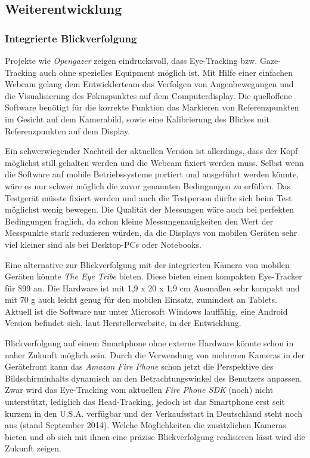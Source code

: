 \subsection{Weiterentwicklung}
\subsubsection{Integrierte Blickverfolgung}
Projekte wie \emph{Opengazer} \cite{TheInferenceGroup..2009} zeigen eindrucksvoll, dass Eye-Tracking bzw. Gaze-Tracking auch ohne spezielles Equipment möglich ist.
Mit Hilfe einer einfachen Webcam gelang dem Entwicklerteam das Verfolgen von Augenbewegungen und die Visualisierung des Fokuspunktes auf dem Computerdisplay.
Die quelloffene Software benötigt für die korrekte Funktion das Markieren von Referenzpunkten im Gesicht auf dem Kamerabild, sowie eine Kalibrierung des Blickes mit Referenzpunkten auf dem Display.

Ein schwerwiegender Nachteil der aktuellen Version ist allerdings, dass der Kopf möglichst still gehalten werden und die Webcam fixiert werden muss.
Selbst wenn die Software auf mobile Betriebssysteme portiert und ausgeführt werden könnte, wäre es nur schwer möglich die zuvor genannten Bedingungen zu erfüllen.
Das Testgerät müsste fixiert werden und auch die Testperson dürfte sich beim Test möglichst wenig bewegen.
Die Qualität der Messungen wäre auch bei perfekten Bedingungen fraglich, da schon kleine Messungenauigkeiten den Wert der Messpunkte stark reduzieren würden, da die Displays von mobilen Geräten sehr viel kleiner sind als bei Desktop-PCs oder Notebooks.

Eine alternative zur Blickverfolgung mit der integrierten Kamera von mobilen Geräten könnte \emph{The Eye Tribe} \cite{TheEyeTribe.2014} bieten.
Diese bieten einen kompakten Eye-Tracker für \$99 an.
Die Hardware ist mit 1,9 x 20 x 1,9 cm Ausmaßen sehr kompakt und mit 70 g auch leicht genug für den mobilen Einsatz, zumindest an Tablets.
Aktuell ist die Software nur unter Microsoft Windows lauffähig, eine Android Version befindet sich, laut Herstellerwebsite, in der Entwicklung.

Blickverfolgung auf einem Smartphone ohne externe Hardware könnte schon in naher Zukunft möglich sein.
Durch die Verwendung von mehreren Kameras in der Gerätefront kann das \emph{Amazon Fire Phone} \cite{amazon.de.2014} schon jetzt die Perspektive des Bildschirminhalts dynamisch an den Betrachtungswinkel des Benutzers anpassen.
Zwar wird das Eye-Tracking vom aktuellen \emph{Fire Phone \ac{SDK}} (noch) nicht unterstützt, lediglich das Head-Tracking, jedoch ist das Smartphone erst seit kurzem in den U.S.A. verfügbar und der Verkaufsstart in Deutschland steht noch aus (stand September 2014).
Welche Möglichkeiten die zusätzlichen Kameras bieten und ob sich mit ihnen eine präzise Blickverfolgung realisieren lässt wird die Zukunft zeigen.